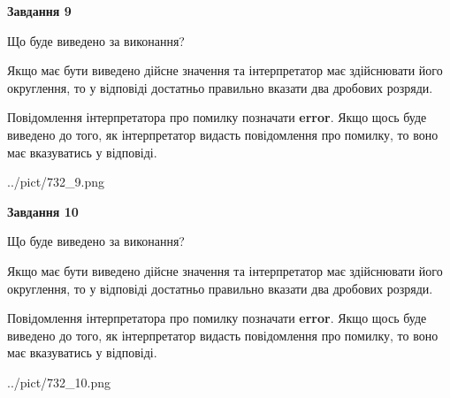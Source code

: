\documentclass[12pt, ukrainian]{article}
\begin{document}
{\begin {Large}
{\begin {center}\textbf{Завдання 9}\end {center}}\par
Що буде виведено за виконання? \par

Якщо має бути виведено дійсне значення та інтерпретатор має здійснювати його округлення, 
то у відповіді достатньо правильно вказати два дробових розряди.

Повідомлення інтерпретатора про помилку позначати \textbf{error}.
Якщо щось буде виведено до того, як інтерпретатор видасть повідомлення про помилку, 
то воно має вказуватись у відповіді. \par

\begin{center}
	{../pict/732_9.png}
\end{center}
\newpage

{\begin {center}\textbf{Завдання 10}\end {center}}\par
Що буде виведено за виконання? \par

Якщо має бути виведено дійсне значення та інтерпретатор має здійснювати його округлення, 
то у відповіді достатньо правильно вказати два дробових розряди.

Повідомлення інтерпретатора про помилку позначати \textbf{error}.
Якщо щось буде виведено до того, як інтерпретатор видасть повідомлення про помилку, 
то воно має вказуватись у відповіді. \par

\begin{center}
	{../pict/732_10.png}
\end{center}
\newpage

\end {Large}}
\end{document}
